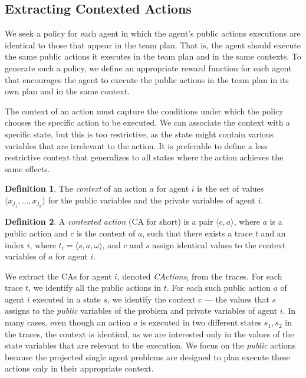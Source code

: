 \documentclass[letterpaper]{article} %
\theoremstyle{definition}
\newtheorem{definition}{Definition}
\newcommand{\cact}[1]{{\em CActions$_#1$}}
\begin{document}
\subsection{Extracting Contexted Actions}

We seek a policy for each agent in which the agent's public actions executions are identical to those that appear in the team plan. That is, the agent should execute the same public actions it executes in the team plan and in the same contexts.
To generate such a policy, we define an appropriate reward function for each agent that encourages the agent to execute the public actions in the team plan in its own plan and in the same context.

The context of an action must capture the conditions under which the policy chooses the specific action to be executed. We can associate the context with a specific state, but this is too restrictive, as the state might contain various variables that are irrelevant to the action. It is preferable to define a less restrictive context that generalizes to all states where the action achieves the same effects. 


\begin{definition}
The {\em context} of an action $a$ for agent $i$ is the set of values $\langle x_{j_1},...,x_{j_k} \rangle$ for the public variables and the private variables of agent $i$.
\end{definition}

\begin{definition}
A {\em contexted action} (CA for short) is a pair $\langle c,a \rangle$, where $a$ is a public action and $c$ is the context of $a$, such that there exists a trace $t$ and an index $i$, where $t_i=\langle s,a,\omega \rangle$, and $c$ and $s$ assign identical values to the context variables of $a$ for agent $i$.
\end{definition}

We extract the CAs for agent $i$, denoted \cact{i} from the traces.
For each trace $t$, we identify all the public actions in $t$. For each such public action $a$ of agent $i$ executed in a state $s$, we identify the context $c$ --- the values that $s$ assigns to the {\em public} variables of the problem and private variables of agent $i$. In many cases, even though an action $a$ is executed in two different states $s_1,s_2$ in the traces, the context is identical, as we are interested only in the values of the state variables that are relevant to the execution.
We focus on the \emph{public} actions because the projected single agent problems are designed to plan execute these actions only in their appropriate context.
\end{document}
